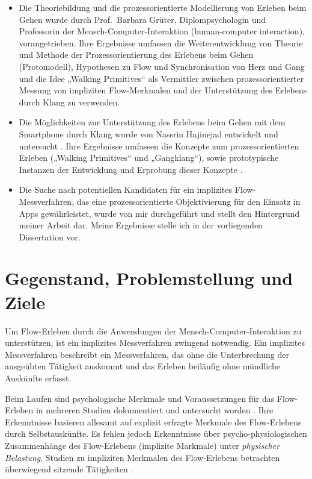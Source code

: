 \begin{itemize}

	\item Die Theoriebildung und die prozessorientierte Modellierung von Erleben beim Gehen wurde durch Prof.\ Barbara Grüter, Diplompsychologin und Professorin der Mensch-Computer-Interaktion (human-computer interaction), vorangetrieben. Ihre Ergebnisse umfassen die Weiterentwicklung von Theorie und Methode der Prozessorientierung des Erlebens beim Gehen (Protomodell), Hypothesen zu Flow und Synchronisation von Herz und Gang und die Idee „Walking Primitives“ als Vermittler zwischen prozessorientierter Messung von impliziten Flow-Merkmalen und der Unterstützung des Erlebens durch Klang zu verwenden.

	\item Die Möglichkeiten zur Unterstützung des Erlebens beim Gehen mit dem Smartphone durch Klang wurde von Nassrin Hajinejad entwickelt und untersucht \citep{Hajinejad2013}. Ihre Ergebnisse umfassen die Konzepte zum prozessorientierten Erleben („Walking Primitives“ und „Gangklang“), sowie prototypische Instanzen der Entwicklung und Erprobung dieser Konzepte \citep{Hajinejad2015}.

	\item Die Suche nach potentiellen Kandidaten für ein implizites Flow-Messverfahren, das eine prozessorientierte Objektivierung für den Einsatz in Apps gewährleistet, wurde von mir durchgeführt und stellt den Hintergrund meiner Arbeit dar. Meine Ergebnisse stelle ich in der vorliegenden Dissertation vor.

\end{itemize}


\section{Gegenstand, Problemstellung und Ziele} %
\label{sec:gegenstand_problemstellung_und_ziele}

Um Flow-Erleben durch die Anwendungen der Mensch-Computer-Interaktion zu unterstützen, ist ein implizites Messverfahren zwingend notwendig. Ein implizites Messverfahren beschreibt ein Messverfahren, das ohne die Unterbrechung der ausgeübten Tätigkeit auskommt und das Erleben beiläufig ohne mündliche Auskünfte erfasst.

Beim Laufen sind psychologische Merkmale und Voraussetzungen für das Flow-Erleben in mehreren Studien dokumentiert und untersucht worden \citep{Stoll2005, Reinhardt2006, Schuler2009, Jimenez-Torres2013}. Ihre Erkenntnisse basieren allesamt auf explizit erfragte Merkmale des Flow-Erlebens durch Selbstauskünfte. Es fehlen jedoch Erkenntnisse über psycho-physiologischen Zusammenhänge des Flow-Erlebens (implizite Markmale) unter \emph{physischer Belastung}. Studien zu impliziten Merkmalen des Flow-Erlebens betrachten überwiegend sitzende Tätigkeiten \citep{deManzano2010, Keller2011, Peifer2014, Tozman2015, Harmat2015}. 


